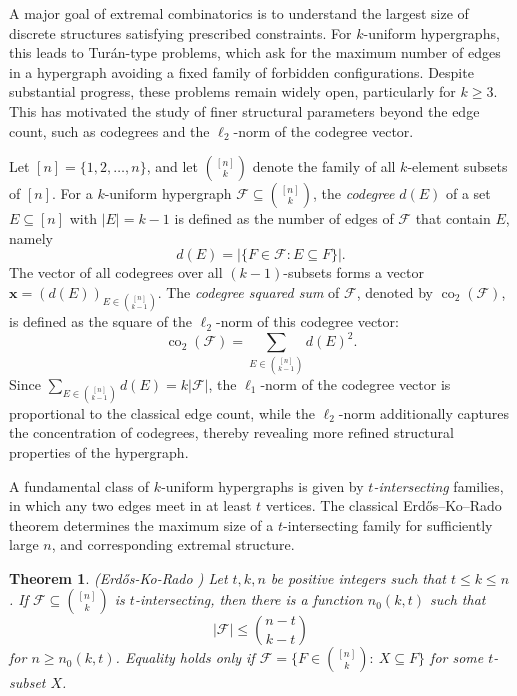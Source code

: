\documentclass[11pt]{article}
\newtheorem{theorem}{Theorem}
\theoremstyle{definition}
\newcommand{\co}{\operatorname{co}_2}
\begin{document}
A major goal of extremal combinatorics is to understand the largest size of discrete structures satisfying prescribed constraints. For $k$-uniform hypergraphs, this leads to Tur\'{a}n-type problems, which ask for the maximum number of edges in a hypergraph avoiding a fixed family of forbidden configurations. Despite substantial progress, these problems remain widely open, particularly for $k\geq 3$. This has motivated the study of finer structural parameters beyond the edge count, such as codegrees and the $\ell_2$-norm of the codegree vector.

Let $[n] = \{1,2,\dots,n\}$, and let $\binom{[n]}{k}$ denote the family of all $k$-element subsets of $[n]$. For a $k$-uniform hypergraph $\mathcal{F} \subseteq \binom{[n]}{k}$, the \emph{codegree} $d(E)$ of a set $E \subseteq [n]$ with $|E| = k-1$ is defined as the number of edges of $\mathcal{F}$ that contain $E$, namely
\[
d(E) = \left| \bigl\{ F \in \mathcal{F} : E \subseteq F \bigr\} \right|.
\]
The vector of all codegrees over all $(k-1)$-subsets forms a vector $\mathbf{x} = (d(E))_{E \in \binom{[n]}{k-1}}$. The \emph{codegree squared sum} of $\mathcal{F}$, denoted by $\co(\mathcal{F})$, is defined as the square of the $\ell_2$-norm of this codegree vector:
\[
\co(\mathcal{F}) = \sum_{E \in \binom{[n]}{k-1}} d(E)^2.
\]
Since $\sum_{E \in \binom{[n]}{k-1}} d(E) = k |\mathcal{F}|$, the $\ell_1$-norm of the codegree vector is proportional to the classical edge count, while the $\ell_2$-norm additionally captures the concentration of codegrees, thereby revealing more refined structural properties of the hypergraph.

A fundamental class of $k$-uniform hypergraphs is given by \emph{$t$-intersecting} families, in which any two edges meet in at least $t$ vertices. The classical Erd\H{o}s--Ko--Rado \cite{EKR1961} theorem  determines the maximum size of a $t$-intersecting family for sufficiently large $n$, and corresponding extremal structure.
 
\begin{theorem}(Erd\H{o}s-Ko-Rado \cite{EKR1961})
Let $t,k,n$ be positive integers such that $t \leq k \leq n$. If $\mathcal{F}\subseteq \binom{[n]}{k}$ is $t$-intersecting, then there is a function $n_{0}(k,t)$ such that 
$$|\mathcal{F}|\leq\binom{n-t}{k-t}$$ for $n\geq n_{0}(k,t)$. Equality holds only if $\mathcal{F}=\{F\in\binom{[n]}{k}: \ X\subseteq F\}$ for some $t$-subset $X$.
\end{theorem}
\end{document}
